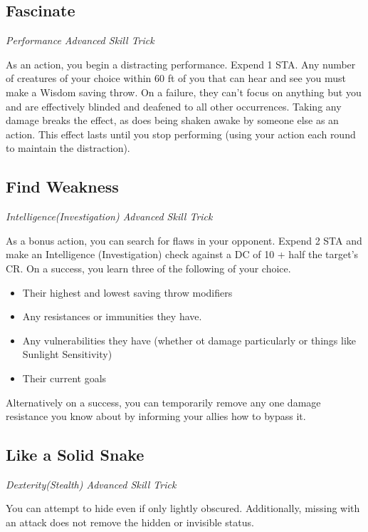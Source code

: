 \subsection{Fascinate}

\textit{Performance Advanced Skill Trick}

As an action, you begin a distracting performance. Expend 1 STA. Any number of creatures of your choice within 60 ft of you that can hear and see you must make a Wisdom saving throw. On a failure, they can't focus on anything but you and are effectively blinded and deafened to all other occurrences. Taking any damage breaks the effect, as does being shaken awake by someone else as an action. This effect lasts until you stop performing (using your action each round to maintain the distraction).

\subsection{Find Weakness}

\textit{Intelligence(Investigation) Advanced Skill Trick}

As a bonus action, you can search for flaws in your opponent. Expend 2 STA and make an Intelligence (Investigation) check against a DC of 10 + half the target's CR. On a success, you learn three of the following of your choice.
\begin{itemize}
	\item Their highest and lowest saving throw modifiers
	\item Any resistances or immunities they have.
	\item Any vulnerabilities they have (whether ot damage particularly or things like Sunlight Sensitivity)
	\item Their current goals
\end{itemize}

Alternatively on a success, you can temporarily remove any one damage resistance you know about by informing your allies how to bypass it.

\subsection{Like a Solid Snake}

\textit{Dexterity(Stealth) Advanced Skill Trick}

You can attempt to hide even if only lightly obscured. Additionally, missing with an attack does not remove the hidden or invisible status.

